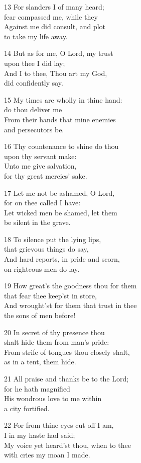 \begin{multicols}{3}
13 For slanders I of many heard;\\
fear compassed me, while they\\
Against me did consult, and plot\\
to take my life away.

14 But as for me, O Lord, my trust\\
upon thee I did lay;\\
And I to thee, Thou art my God,\\
did confidently say.

15 My times are wholly in thine hand:\\
do thou deliver me\\
From their hands that mine enemies\\
and persecutors be.

16 Thy countenance to shine do thou\\
upon thy servant make:\\
Unto me give salvation,\\
for thy great mercies’ sake.

17 Let me not be ashamed, O Lord,\\
for on thee called I have:\\
Let wicked men be shamed, let them\\
be silent in the grave.

18 To silence put the lying lips,\\
that grievous things do say,\\
And hard reports, in pride and scorn,\\
on righteous men do lay.

19 How great’s the goodness thou for them\\
that fear thee keep’st in store,\\
And wrought’st for them that trust in thee\\
the sons of men before!

20 In secret of thy presence thou\\
shalt hide them from man’s pride:\\
From strife of tongues thou closely shalt,\\
as in a tent, them hide.

21 All praise and thanks be to the Lord;\\
for he hath magnified\\
His wondrous love to me within\\
a city fortified.

22 For from thine eyes cut off I am,\\
I in my haste had said;\\
My voice yet heard’st thou, when to thee\\
with cries my moan I made.


\end{multicols}

